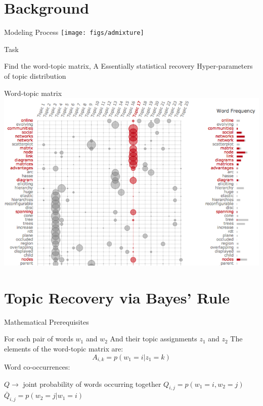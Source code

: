 \documentclass{lecture}
\begin{document}
\section[Background]{Background}

\begin{plain}{Modeling Process}
	\texttt{[image: figs/admixture]}
\end{plain}

\begin{plain}{Task}
	\begin{itemize}
		\p Find the word-topic matrix, A
		\p Essentially statistical recovery
		\p Hyper-parameters of topic distribution
	\end{itemize}
\end{plain}

\begin{plain}{Word-topic matrix}
	\includegraphics[scale=0.4]{figs/word_topic}
\end{plain}

\section[Topic Recovery]{Topic Recovery via Bayes' Rule}

\begin{plain}{Mathematical Prerequisites}
	\begin{itemize}
		\p For each pair of words $w_1$ and $w_2$ 
		\p And their topic assignments $z_1$ and $z_2$
		\p The elements of the word-topic matrix are:\\
		$$A_{i,k} = p(w_1 = i | z_1 = k)$$
		\p Word co-occurrences:
		\begin{itemize}
			\p $Q \rightarrow$ joint probability of words occurring together
			\p $Q_{i,j} = p(w_1 = i, w_2 = j)$
			\p $\bar{Q}_{i,j} = p(w_2 = j | w_1 = i)$
		\end{itemize}
	\end{itemize}

\end{plain}
\end{document}
